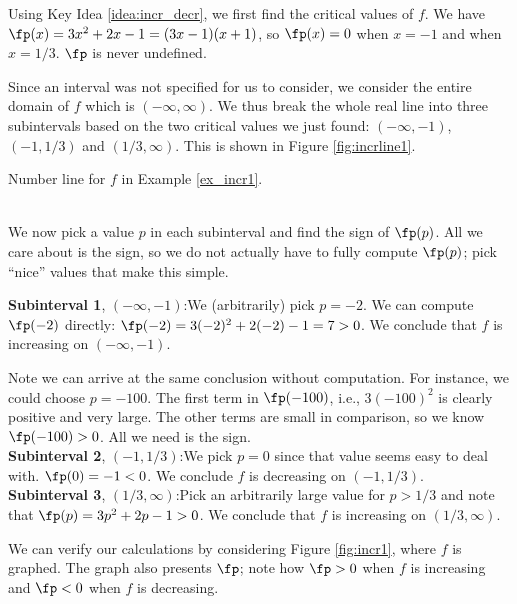 {Using Key Idea \ref{idea:incr_decr}, we first find the critical values of $f$. We have $\fp(x) = 3x^2+2x-1 = (3x-1)(x+1)$, so $\fp(x) = 0$ when $x=-1$ and when $x=1/3$. $\fp$ is never undefined.

Since an interval was not specified for us to consider, we consider the entire domain of $f$ which is $(-\infty,\infty)$. We thus break the whole real line into three subintervals based on the two critical values we just found: $(-\infty,-1)$, $(-1,1/3)$ and $(1/3,\infty)$. This is shown in Figure \ref{fig:incrline1}.\\

\noindent\begin{minipage}{\textwidth}\centering
{}
\captionsetup{type=figure}%
\caption{Number line for $f$ in Example \ref{ex_incr1}.}\label{fig:incrline1}
\end{minipage}\\

We now pick a value $p$ in each subinterval and find the sign of $\fp(p)$. All we care about is the sign, so we do not actually have to fully compute $\fp(p)$; pick ``nice'' values that make this simple.

\noindent\textbf{Subinterval 1}, $(-\infty,-1)$:\quad We (arbitrarily) pick $p=-2$. We can compute $\fp(-2)$ directly: $\fp(-2) = 3(-2)^2+2(-2)-1=7>0$. We conclude that $f$ is increasing on $(-\infty,-1)$.

Note we can arrive at the same conclusion without computation. For instance, we could choose $p=-100$. The first term in $\fp(-100)$, i.e., $3(-100)^2$ is clearly positive and very large. The other terms are small in comparison, so we know $\fp(-100)>0$. All we need is the sign.\\

\noindent\textbf{Subinterval 2}, $(-1,1/3)$:\quad We pick $p=0$ since that value seems easy to deal with. $\fp(0) = -1<0$. We conclude $f$ is decreasing on $(-1,1/3)$.\\

\noindent\textbf{Subinterval 3}, $(1/3,\infty)$:\quad Pick an arbitrarily large value for $p>1/3$ and note that $\fp(p) =3p^2+2p-1 >0$. We conclude that $f$ is increasing on $(1/3,\infty)$.

We can verify our calculations by considering Figure \ref{fig:incr1}, where $f$ is graphed. The graph also presents $\fp$; note how $\fp>0$ when $f$ is increasing and $\fp<0$ when $f$ is decreasing.
}\\

